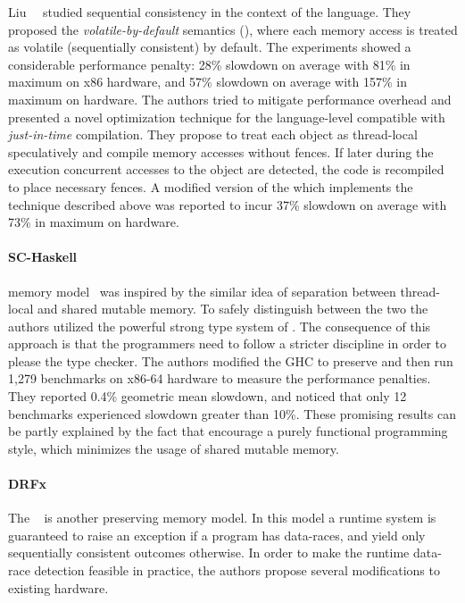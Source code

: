 Liu~\etal~\cite{Liu-al:OOPSLA17, Liu-al:PLDI19} studied 
sequential consistency in the context of the \Java language.  
They proposed the \emph{volatile-by-default} semantics (\VbD),
where each memory access is treated as volatile 
(\ie sequentially consistent) by default. 
The experiments showed a considerable performance penalty:
28\% slowdown on average with 81\% in maximum on x86 hardware,
and 57\% slowdown on average with 157\% in maximum on  hardware.
The authors tried to mitigate performance overhead and presented  
a novel optimization technique for the language-level \SC
compatible with \emph{just-in-time} compilation. 
They propose to treat each object as thread-local speculatively 
and compile memory accesses without fences. 
If later during the execution concurrent accesses to the object  
are detected, the code is recompiled to place necessary fences.
A modified version of the \JVM which implements the technique
described above was reported to incur 37\% slowdown on average 
with 73\% in maximum on  hardware.

\paragraph{SC-Haskell}

\SCHs memory model~\cite{Vollmer-al:PPoPP17}
was inspired by the similar idea of separation
between thread-local and shared mutable memory. 
To safely distinguish between the two 
the authors utilized the powerful strong type system of \Haskell. 
The consequence of this approach is that the 
programmers need to follow a stricter discipline 
in order to please the type checker. 
The authors modified the GHC to preserve \SC 
and then run 1,279 benchmarks on x86-64 hardware
to measure the performance penalties.
They reported 0.4\% geometric mean slowdown,
and noticed that only 12 benchmarks experienced 
slowdown greater than 10\%.
These promising results can be partly explained 
by the fact that \Haskell encourage a 
purely functional programming style, 
which minimizes the usage of shared mutable memory.  

\paragraph{DRFx}

The \DRFx~\cite{Marino-al:PLDI10, Marino-al:TOPLAS2016} 
is another \SC preserving memory model. 
In this model a runtime system is guaranteed to raise 
an exception if a program has data-races, 
and yield only sequentially consistent outcomes otherwise.
In order to make the runtime data-race detection feasible 
in practice, the authors propose several modifications 
to existing hardware.

